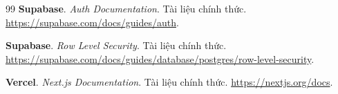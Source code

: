 \documentclass[12pt,a4paper,oneside]{report}
\begin{document}
\begin{thebibliography}{99}
  \textbf{Supabase}. \textit{Auth Documentation}. Tài liệu chính thức. \url{https://supabase.com/docs/guides/auth}.

  \textbf{Supabase}. \textit{Row Level Security}. Tài liệu chính thức. \url{https://supabase.com/docs/guides/database/postgres/row-level-security}.

  \textbf{Vercel}. \textit{Next.js Documentation}. Tài liệu chính thức. \url{https://nextjs.org/docs}.

\end{thebibliography}
\end{document}
